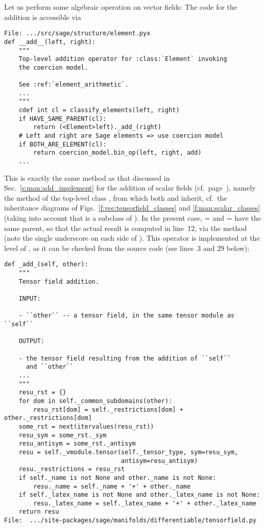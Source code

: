 Let us perform some algebraic operation on vector fields:
The code for the addition is accessible via
\begin{lstlisting}
File: .../src/sage/structure/element.pyx
def __add__(left, right):
    """
    Top-level addition operator for :class:`Element` invoking
    the coercion model.

    See :ref:`element_arithmetic`.
    ...
    """
    cdef int cl = classify_elements(left, right)
    if HAVE_SAME_PARENT(cl):
        return (<Element>left)._add_(right)
    # Left and right are Sage elements => use coercion model
    if BOTH_ARE_ELEMENT(cl):
        return coercion_model.bin_op(left, right, add)
    ...
\end{lstlisting}
This is exactly the same method  as that discussed in
Sec.~\ref{s:man:add_implement} for the addition of scalar fields (cf.\ page~\pageref{p:man:list___add__}), namely
the method  of the top-level class , from
which both  and  inherit, cf.\ the inheritance
diagrams of Figs.~\ref{f:vec:tensorfield_classes} and
\ref{f:man:scalar_classes} (taking into account that
 is a subclass of ).
In the present case,  =  and  = 
have the same parent, so that the actual result is computed in line~12,
via the method 
(note the single underscore on each side of ). This operator is
implemented at the level of , as it can be checked from the source code
(see lines~3 and 29 below):
\begin{lstlisting}
def _add_(self, other):
    """
    Tensor field addition.

    INPUT:

    - ``other`` -- a tensor field, in the same tensor module as ``self``

    OUTPUT:

    - the tensor field resulting from the addition of ``self``
      and ``other``
    ...
    """
    resu_rst = {}
    for dom in self._common_subdomains(other):
        resu_rst[dom] = self._restrictions[dom] + other._restrictions[dom]
    some_rst = next(itervalues(resu_rst))
    resu_sym = some_rst._sym
    resu_antisym = some_rst._antisym
    resu = self._vmodule.tensor(self._tensor_type, sym=resu_sym,
                                antisym=resu_antisym)
    resu._restrictions = resu_rst
    if self._name is not None and other._name is not None:
        resu._name = self._name + '+' + other._name
    if self._latex_name is not None and other._latex_name is not None:
        resu._latex_name = self._latex_name + '+' + other._latex_name
    return resu
File:  .../site-packages/sage/manifolds/differentiable/tensorfield.py
\end{lstlisting}
